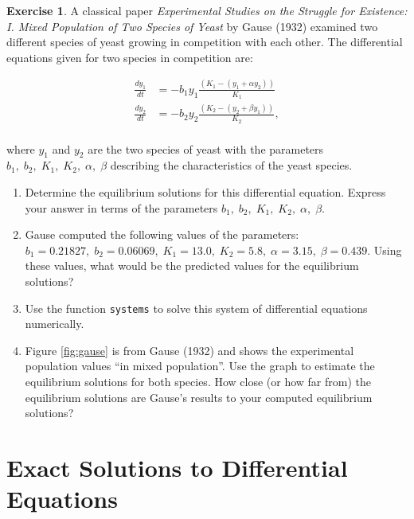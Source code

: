 \documentclass[
]{book}
\theoremstyle{definition}
\theoremstyle{definition}
\theoremstyle{definition}
\newtheorem{exercise}{Exercise}[chapter]
\theoremstyle{remark}
\begin{document}
\begin{exercise}
\protect\hypertarget{exr:unnamed-chunk-113}{}{\label{exr:unnamed-chunk-113} } A classical paper \emph{Experimental Studies on the Struggle for Existence: I. Mixed Population of Two Species of Yeast} by Gause (1932) examined two different species of yeast growing in competition with each other. The differential equations given for two species in competition are:

\begin{align*}
\frac{dy_{1}}{dt} &= -b_{1} y_{1} \frac{(K_{1}-(y_{1}+\alpha y_{2}) )}{K_{1}} \\
\frac{dy_{2}}{dt} &= -b_{2} y_{2} \frac{(K_{2}-(y_{2}+\beta y_{1}) )}{K_{2}}, \\
\end{align*}

where \(y_{1}\) and \(y_{2}\) are the two species of yeast with the parameters \(b_{1}, \; b_{2}, \; K_{1}, \; K_{2}, \; \alpha, \; \beta\) describing the characteristics of the yeast species.

\begin{enumerate}[label=\alph*.]
\item Determine the equilibrium solutions for this differential equation.  Express your answer in terms of the parameters $b_{1}, \; b_{2}, \; K_{1}, \; K_{2}, \; \alpha, \; \beta$.
\item Gause computed the following values of the parameters: $b_{1}=0.21827, \; b_{2}=0.06069, \; K_{1}=13.0, \; K_{2}=5.8, \; \alpha=3.15, \; \beta=0.439$.  Using these values, what would be the predicted values for the equilibrium solutions?
\item Use the function \texttt{systems} to solve this system of differential equations numerically.
   
   \item Figure \ref{fig:gause} is from Gause (1932) and shows the experimental population values ``in mixed population''.  Use the graph to estimate the equilibrium solutions for both species. How close (or how far from) the equilibrium solutions are Gause's results to your computed equilibrium solutions?

\end{enumerate}
\end{exercise}

\hypertarget{exact-solns-07}{%
\chapter{Exact Solutions to Differential Equations}\label{exact-solns-07}}
\end{document}
